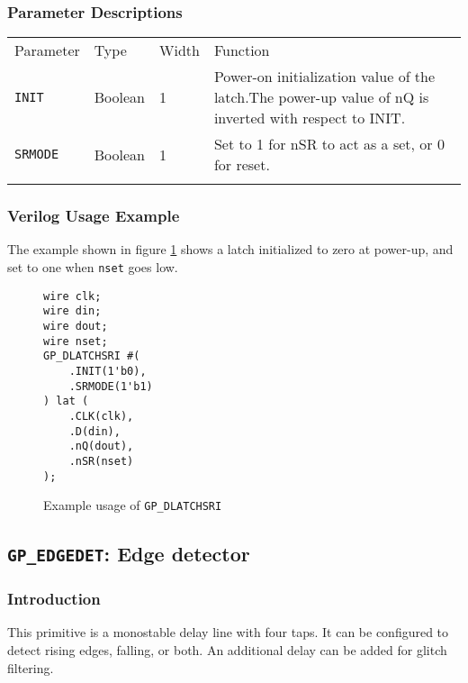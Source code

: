\documentclass[11pt]{article}
\newcommand{\tokenstyle}[1]{\texttt{#1}}
\newcommand{\wirestyle}[1]{\texttt{#1}}
\newcommand{\whenstyle}[1]{{\fontseries{sb}\selectfont#1}}
\newcommand{\thinhline}{\Xhline{1\arrayrulewidth}}
\newcommand{\thickhline}{\Xhline{2.5\arrayrulewidth}}
\begin{document}
\subsubsection{Parameter Descriptions}

\begin{tabularx}{\textwidth}{lllX}
\thinhline
\whenstyle{Parameter} & \whenstyle{Type} & \whenstyle{Width} & \whenstyle{Function} \\
\thickhline
\tokenstyle{INIT} & Boolean & 1 & Power-on initialization value of the latch.\newline The power-up value of nQ is
inverted with respect to INIT.\\
\thinhline
\tokenstyle{SRMODE} & Boolean & 1 & Set to 1 for nSR to act as a set, or 0 for reset. \\
\thinhline
\end{tabularx}

\subsubsection{Verilog Usage Example}

The example shown in figure \ref{gp-dlatchsri-example} shows a latch initialized to zero at power-up, and set to one
when \wirestyle{nset} goes low.

\begin{figure}[h]
\begin{lstlisting}
wire clk;
wire din;
wire dout;
wire nset;
GP_DLATCHSRI #(
	.INIT(1'b0),
	.SRMODE(1'b1)
) lat (
	.CLK(clk),
	.D(din),
	.nQ(dout),
	.nSR(nset)
);
\end{lstlisting}
\caption{Example usage of \tokenstyle{GP\_DLATCHSRI}}
\label{gp-dlatchsri-example}
\end{figure}


\pagebreak
\subsection{\tokenstyle{GP\_EDGEDET}: Edge detector}
\label{gp-edgedet}

\subsubsection{Introduction}

This primitive is a monostable delay line with four taps. It can be configured to detect rising edges, falling, or
both. An additional delay can be added for glitch filtering.
\end{document}
